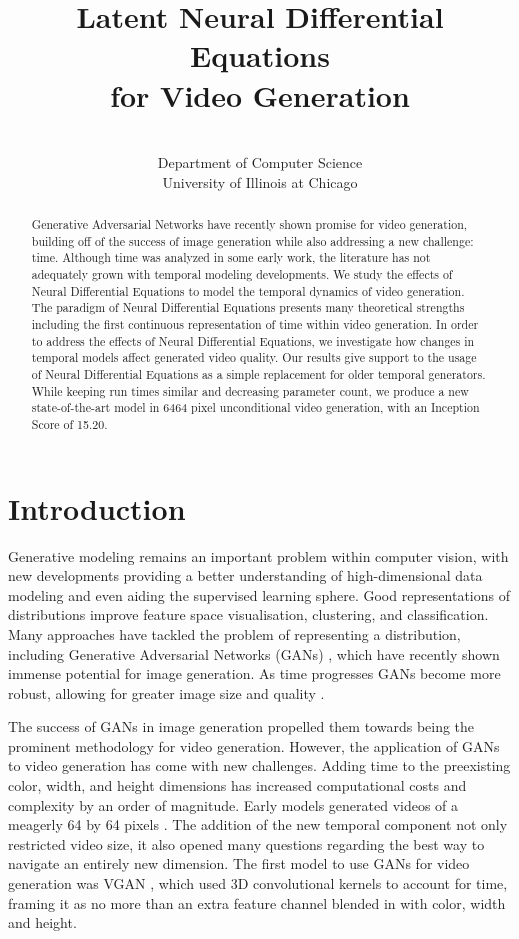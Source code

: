 \documentclass[tablecaption=bottom,pmlr]{jmlr}
\title{Latent Neural Differential Equations\;\\ for Video Generation}
\author{\Name{Cade Gordon} \Email{cadegordonml@gmail.com}\and
   \Name{Natalie Parde} \Email{parde@uic.edu}\\
   \addr Department of Computer Science \\ University of Illinois at Chicago}
\begin{document}
\maketitle

\begin{abstract}
  Generative Adversarial Networks have recently shown promise for video generation, building off of the success of image generation while also addressing a new challenge: time. Although time was analyzed in some early work, the literature has not adequately grown with temporal modeling developments. We study the effects of Neural Differential Equations to model the temporal dynamics of video generation. The paradigm of Neural Differential Equations presents many theoretical strengths including the first continuous representation of time within video generation. In order to address the effects of Neural Differential Equations, we investigate how changes in temporal models affect generated video quality. Our results give support to the usage of Neural Differential Equations as a simple replacement for older temporal generators. While keeping run times similar and decreasing parameter count, we produce a new state-of-the-art model in 6464 pixel unconditional video generation, with an Inception Score of 15.20.
\end{abstract}

\section{Introduction}

Generative modeling remains an important problem within computer vision, with new developments providing a better understanding of high-dimensional data modeling and even aiding the supervised learning sphere. Good representations of distributions improve
feature space visualisation, clustering, and classification.  Many approaches have tackled the problem of representing a distribution, including Generative Adversarial Networks (GANs) \citep{gans}, which have recently shown immense potential for image generation. As time progresses GANs become more robust, allowing for greater image size \citep{dcgan,proggan,biggan} and quality \citep{stylegan1,stylegan2}.

The success of GANs in image generation propelled them towards being the prominent methodology for video generation. However, the application of GANs to video generation has come with new challenges. Adding time to the preexisting color, width, and height dimensions has increased computational costs and complexity by an order of magnitude. Early models generated videos of a meagerly 64 by 64 pixels \citep{vgan,tgan,mocogan}. The addition of the new temporal component not only restricted video size, it also opened many questions regarding the best way to navigate an entirely new dimension. The first model to use GANs for video generation was VGAN \citep{vgan}, which used 3D convolutional kernels to account for time, framing it as no more than an extra feature channel blended in with color, width and height.
\end{document}
